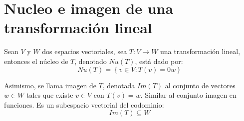 \documentclass[12pt]{article}
\begin{document}
\section{Nucleo e imagen de una transformación lineal}

Sean \(V\) y \(W\) dos espacios vectoriales,
sea \(T: V \rightarrow W\) una transformación lineal,
entonces el núcleo de \(T\),
denotado \(Nu(T)\),
está dado por:
\begin{equation}
    Nu(T) = \left\{v \in V:T(v) = 0w\right\}
\end{equation}

Asimismo,
se llama imagen de \(T\),
denotada \(Im(T)\) al conjunto de vectores \(w \in W\)
tales que existe \(v \in V\) con \(T(v) = w\).
Similar al conjunto imagen en funciones.
Es un subespacio vectorial del codominio:
\begin{equation}
    Im(T) \subseteq W
\end{equation}
\end{document}
